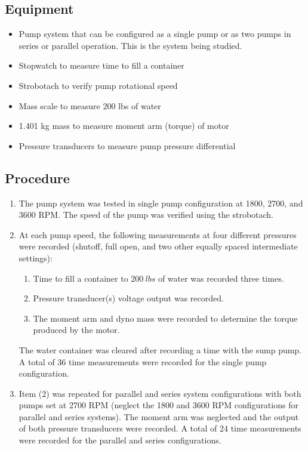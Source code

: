 \subsection{Equipment}
\begin{itemize}
    \item Pump system that can be configured as a single pump or as two pumps in series or parallel operation. This is the system being studied.
    \item Stopwatch to measure time to fill a container 
    \item Strobotach to verify pump rotational speed
    \item Mass scale to measure 200 lbs of water
    \item 1.401 kg mass to measure moment arm (torque) of motor
    \item Pressure transducers to measure pump pressure differential
\end{itemize}

\subsection{Procedure}
\begin{enumerate}[label=\arabic*.]
    \item The pump system was tested in single pump configuration at 1800, 2700, and 3600 RPM. The speed of the pump was verified using the strobotach.
    \item At each pump speed, the following measurements at four different pressures were recorded (shutoff, full open, and two other equally spaced intermediate settings):
    \begin{enumerate}[label=\roman*.]
        \item Time to fill a container to $\qty{200}{lbs}$ of water was recorded three times.
        \item Pressure transducer(s) voltage output was recorded.
        \item The moment arm and dyno mass were recorded to determine the torque produced by the motor.
    \end{enumerate}
    The water container was cleared after recording a time with the sump pump. A total of 36 time measurements were recorded for the single pump configuration.
    \item Item (2) was repeated for parallel and series system configurations with both pumps set at 2700 RPM (neglect the 1800 and 3600 RPM configurations for parallel and series systems). The moment arm was neglected and the output of both pressure transducers were recorded. A total of 24 time measurements were recorded for the parallel and series configurations.
\end{enumerate}